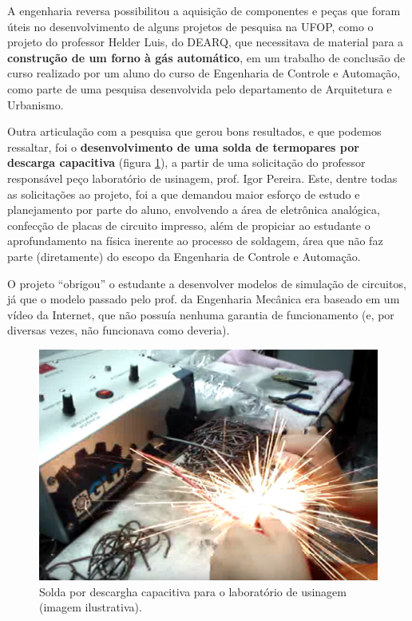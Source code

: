 \documentclass[
	12pt,				%
	openright,			%
	oneside,			%
	a4paper,			%
	english,			%
	spanish,			%
	brazil,				%
	]{abntex2}
\begin{document}
A engenharia reversa possibilitou a aquisição de componentes e peças
que foram úteis no desenvolvimento de alguns projetos de pesquisa na UFOP, como o projeto do professor Helder Luis, do DEARQ, que necessitava de material para a \textbf{construção de um forno à gás automático}, em um  trabalho de conclusão de curso realizado por um aluno do curso de Engenharia de Controle e Automação, como parte de uma pesquisa desenvolvida pelo departamento de Arquitetura e Urbanismo.

Outra articulação com a pesquisa que gerou bons resultados, e que podemos ressaltar, foi o \textbf{desenvolvimento de uma solda de termopares por descarga capacitiva} (figura \ref{fig:solda}), a partir de uma solicitação do professor responsável peço laboratório de usinagem, prof. Igor Pereira. Este, dentre todas as solicitações ao projeto, foi a que demandou maior esforço de estudo e planejamento por parte do aluno, envolvendo a área de eletrônica analógica, confecção de placas de circuito impresso, além de propiciar ao estudante o aprofundamento na física inerente ao processo de soldagem, área que não faz parte (diretamente) do escopo da Engenharia de Controle e Automação.

O projeto ``obrigou'' o estudante a desenvolver modelos de simulação de circuitos, já que o modelo passado pelo prof. da Engenharia Mecânica era baseado em um vídeo da Internet, que não possuía nenhuma garantia de funcionamento (e, por diversas vezes, não funcionava como deveria).

\begin{figure}[H]
	\centering
	\includegraphics[scale=0.7]{figuras/solda-capacitiva.pdf}
	\caption{Solda por descargha capacitiva para o laboratório de usinagem (imagem ilustrativa).}  \label{fig:solda} 
\end{figure}
\end{document}
